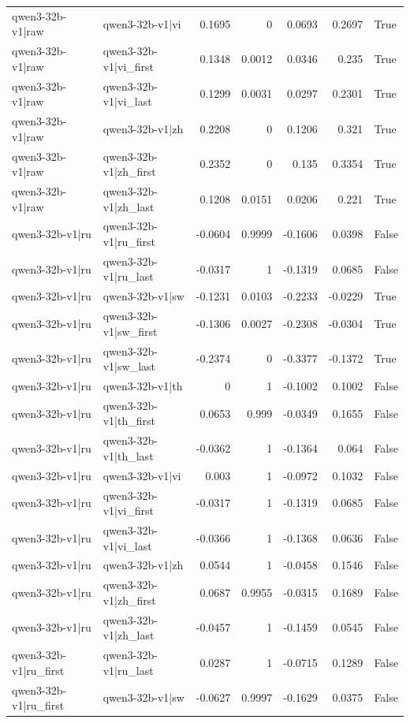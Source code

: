 \begin{table}
\begin{tabular}{l l r r r r l}
qwen3-32b-v1|raw & qwen3-32b-v1|vi & 0.1695 & 0 & 0.0693 & 0.2697 & True \\
qwen3-32b-v1|raw & qwen3-32b-v1|vi_first & 0.1348 & 0.0012 & 0.0346 & 0.235 & True \\
qwen3-32b-v1|raw & qwen3-32b-v1|vi_last & 0.1299 & 0.0031 & 0.0297 & 0.2301 & True \\
qwen3-32b-v1|raw & qwen3-32b-v1|zh & 0.2208 & 0 & 0.1206 & 0.321 & True \\
qwen3-32b-v1|raw & qwen3-32b-v1|zh_first & 0.2352 & 0 & 0.135 & 0.3354 & True \\
qwen3-32b-v1|raw & qwen3-32b-v1|zh_last & 0.1208 & 0.0151 & 0.0206 & 0.221 & True \\
qwen3-32b-v1|ru & qwen3-32b-v1|ru_first & -0.0604 & 0.9999 & -0.1606 & 0.0398 & False \\
qwen3-32b-v1|ru & qwen3-32b-v1|ru_last & -0.0317 & 1 & -0.1319 & 0.0685 & False \\
qwen3-32b-v1|ru & qwen3-32b-v1|sw & -0.1231 & 0.0103 & -0.2233 & -0.0229 & True \\
qwen3-32b-v1|ru & qwen3-32b-v1|sw_first & -0.1306 & 0.0027 & -0.2308 & -0.0304 & True \\
qwen3-32b-v1|ru & qwen3-32b-v1|sw_last & -0.2374 & 0 & -0.3377 & -0.1372 & True \\
qwen3-32b-v1|ru & qwen3-32b-v1|th & 0 & 1 & -0.1002 & 0.1002 & False \\
qwen3-32b-v1|ru & qwen3-32b-v1|th_first & 0.0653 & 0.999 & -0.0349 & 0.1655 & False \\
qwen3-32b-v1|ru & qwen3-32b-v1|th_last & -0.0362 & 1 & -0.1364 & 0.064 & False \\
qwen3-32b-v1|ru & qwen3-32b-v1|vi & 0.003 & 1 & -0.0972 & 0.1032 & False \\
qwen3-32b-v1|ru & qwen3-32b-v1|vi_first & -0.0317 & 1 & -0.1319 & 0.0685 & False \\
qwen3-32b-v1|ru & qwen3-32b-v1|vi_last & -0.0366 & 1 & -0.1368 & 0.0636 & False \\
qwen3-32b-v1|ru & qwen3-32b-v1|zh & 0.0544 & 1 & -0.0458 & 0.1546 & False \\
qwen3-32b-v1|ru & qwen3-32b-v1|zh_first & 0.0687 & 0.9955 & -0.0315 & 0.1689 & False \\
qwen3-32b-v1|ru & qwen3-32b-v1|zh_last & -0.0457 & 1 & -0.1459 & 0.0545 & False \\
qwen3-32b-v1|ru_first & qwen3-32b-v1|ru_last & 0.0287 & 1 & -0.0715 & 0.1289 & False \\
qwen3-32b-v1|ru_first & qwen3-32b-v1|sw & -0.0627 & 0.9997 & -0.1629 & 0.0375 & False \\

\end{tabular}
\end{table}
